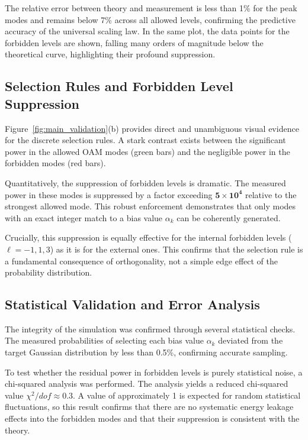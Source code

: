 \documentclass[a4paper,12pt]{article}
\begin{document}
The relative error between theory and measurement is less than 1\% for the peak modes and remains below 7\% across all allowed levels, confirming the predictive accuracy of the universal scaling law. In the same plot, the data points for the forbidden levels are shown, falling many orders of magnitude below the theoretical curve, highlighting their profound suppression.

\subsection{Selection Rules and Forbidden Level Suppression}

Figure~\ref{fig:main_validation}(b) provides direct and unambiguous visual evidence for the discrete selection rules. A stark contrast exists between the significant power in the allowed OAM modes (green bars) and the negligible power in the forbidden modes (red bars).

Quantitatively, the suppression of forbidden levels is dramatic. The measured power in these modes is suppressed by a factor exceeding $\mathbf{5 \times 10^4}$ relative to the strongest allowed mode. This robust enforcement demonstrates that only modes with an exact integer match to a bias value $\alpha_k$ can be coherently generated.

Crucially, this suppression is equally effective for the internal forbidden levels ($\ell=-1, 1, 3$) as it is for the external ones. This confirms that the selection rule is a fundamental consequence of orthogonality, not a simple edge effect of the probability distribution.

\subsection{Statistical Validation and Error Analysis}

The integrity of the simulation was confirmed through several statistical checks. The measured probabilities of selecting each bias value $\alpha_k$ deviated from the target Gaussian distribution by less than 0.5\%, confirming accurate sampling.

To test whether the residual power in forbidden levels is purely statistical noise, a chi-squared analysis was performed. The analysis yields a reduced chi-squared value $\chi^2/dof \approx 0.3$. A value of approximately 1 is expected for random statistical fluctuations, so this result confirms that there are no systematic energy leakage effects into the forbidden modes and that their suppression is consistent with the theory.
\end{document}
